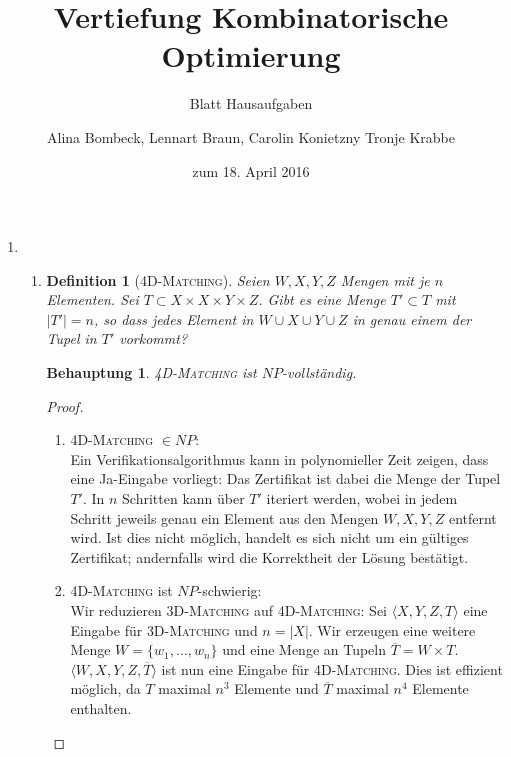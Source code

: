 \documentclass[a4paper]{scrartcl}
\title{Vertiefung Kombinatorische Optimierung}
\subtitle{Blatt {\blattnr} Hausaufgaben}
\author{%
    Alina Bombeck,
    Lennart Braun,
    Carolin Konietzny
    Tronje Krabbe
}
\date{zum 18. April 2016}
\newtheorem*{proposition}{Behauptung}
\newtheorem*{definition}{Definition}
\begin{document}
\maketitle


\begin{enumerate}[label=\bfseries \arabic*.]
\item %
\begin{enumerate}
\item
    \begin{definition}[\textsc{4D-Matching}]
        Seien $W,X,Y,Z$ Mengen mit je $n$ Elementen.
        Sei $T \subset X \times X \times Y \times Z$.
        Gibt es eine Menge $T' \subset T$ mit $|T'| = n$, so dass jedes Element
        in $W \cup X \cup Y \cup Z$ in genau einem der Tupel in $T'$ vorkommt?
    \end{definition}
    \begin{proposition}
        \textsc{4D-Matching} ist $NP$-vollständig.
    \end{proposition}
    \begin{proof}
        \hfill \\
        \begin{enumerate}
            \item \textsc{4D-Matching} $\in NP$: \\
                Ein Verifikationsalgorithmus kann in polynomieller Zeit zeigen,
                dass eine Ja-Eingabe vorliegt: Das Zertifikat ist dabei die
                Menge der Tupel $T'$. In $n$ Schritten kann über $T'$ iteriert
                werden, wobei in jedem Schritt jeweils genau ein Element aus
                den Mengen $W,X,Y,Z$ entfernt wird. Ist dies nicht möglich,
                handelt es sich nicht um ein gültiges Zertifikat; andernfalls
                wird die Korrektheit der Lösung bestätigt.

            \item \textsc{4D-Matching} ist $NP$-schwierig: \\
                Wir reduzieren \textsc{3D-Matching} auf \textsc{4D-Matching}:
                Sei $\langle X,Y,Z,T \rangle$ eine Eingabe für
                \textsc{3D-Matching} und $n = |X|$.  Wir erzeugen eine weitere
                Menge $W = \{w_1, \dotsc, w_n\}$ und eine Menge an Tupeln
                $\overline{T} = W \times T$.  $\langle W,X,Y,Z,\overline{T}
                \rangle$ ist nun eine Eingabe für \textsc{4D-Matching}.
                Dies ist effizient möglich, da $T$ maximal $n^3$ Elemente und
                $\overline{T}$ maximal $n^4$ Elemente enthalten.


\end{enumerate}
\end{proof}
\end{enumerate}
\end{enumerate}
\end{document}
